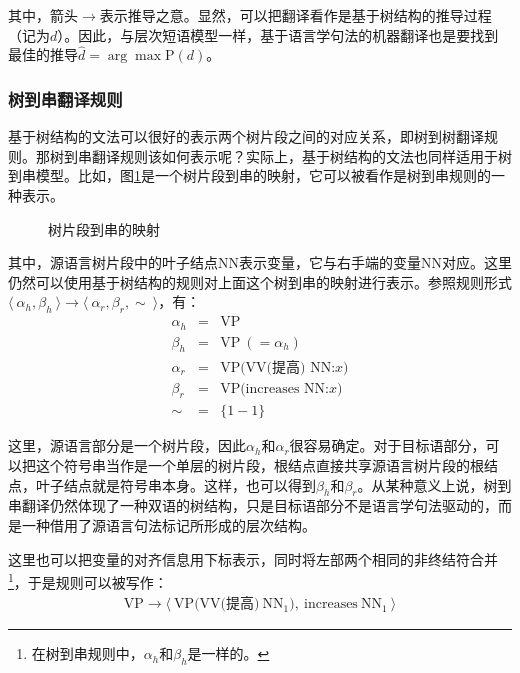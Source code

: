 \noindent 其中，箭头$\rightarrow$表示推导之意。显然，可以把翻译看作是基于树结构的推导过程（记为$d$）。因此，与层次短语模型一样，基于语言学句法的机器翻译也是要找到最佳的推导$\hat{d} = \arg\max\textrm{P}(d)$。


\subsubsection{树到串翻译规则}

\parinterval 基于树结构的文法可以很好的表示两个树片段之间的对应关系，即树到树翻译规则。那树到串翻译规则该如何表示呢？实际上，基于树结构的文法也同样适用于树到串模型。比如，图\ref{fig:4-49}是一个树片段到串的映射，它可以被看作是树到串规则的一种表示。

\begin{figure}[htp]
\centering

\caption{树片段到串的映射}
\label{fig:4-49}
\end{figure}

\noindent 其中，源语言树片段中的叶子结点NN表示变量，它与右手端的变量NN对应。这里仍然可以使用基于树结构的规则对上面这个树到串的映射进行表示。参照规则形式$\langle\  \alpha_h, \beta_h\ \rangle \to \langle\ \alpha_r, \beta_r, \sim\ \rangle$，有：
\begin{eqnarray}
\alpha_h & = & \textrm{VP} \nonumber \\
\beta_h & = & \textrm{VP}\ (=\alpha_h) \nonumber \\
\alpha_r & = & \textrm{VP(VV(提高) NN:}x) \nonumber \\
\beta_r & = & \textrm{VP(increases\ NN:}x) \nonumber \\
\sim & = & \{1-1\} \nonumber
\end{eqnarray}

\parinterval 这里，源语言部分是一个树片段，因此$\alpha_h$和$\alpha_r$很容易确定。对于目标语部分，可以把这个符号串当作是一个单层的树片段，根结点直接共享源语言树片段的根结点，叶子结点就是符号串本身。这样，也可以得到$\beta_h$和$\beta_r$。从某种意义上说，树到串翻译仍然体现了一种双语的树结构，只是目标语部分不是语言学句法驱动的，而是一种借用了源语言句法标记所形成的层次结构。

\parinterval 这里也可以把变量的对齐信息用下标表示，同时将左部两个相同的非终结符合并\footnote[8]{在树到串规则中，$\alpha_h$和$\beta_h$是一样的。}，于是规则可以被写作：
\begin{eqnarray}
\textrm{VP} \rightarrow \langle\ \textrm{VP(VV(提高)}\ \textrm{NN}_1),\ \textrm{increases}\ \textrm{NN}_1\ \rangle \nonumber
\end{eqnarray}

